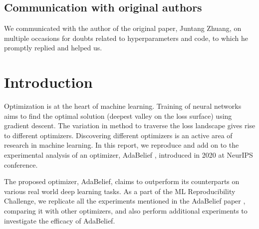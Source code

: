 \subsection*{Communication with original authors}
We communicated with the author of the original paper, Juntang Zhuang, on multiple occasions for doubts related to hyperparameters and code, to which he promptly replied and helped us.


\newpage
\section{Introduction}
\label{intro}
Optimization is at the heart of machine learning. Training of neural networks aims to find the optimal solution (deepest valley on the loss surface) using gradient descent. The variation in method to traverse the loss landscape gives rise to different optimizers. Discovering different optimizers is an active area of research in machine learning.
In this report, we reproduce and add on to the experimental analysis of an optimizer, AdaBelief \cite{zhuang_adabelief_2020}, introduced in 2020 at NeurIPS conference.

\par
The proposed optimizer, AdaBelief, claims to outperform its counterparts on various real world deep learning tasks. As a part of the ML Reproducibility Challenge, we replicate all the experiments mentioned in the AdaBelief paper \cite{zhuang_adabelief_2020}, comparing it with other optimizers, and also perform additional experiments to investigate the efficacy of AdaBelief.

\par



